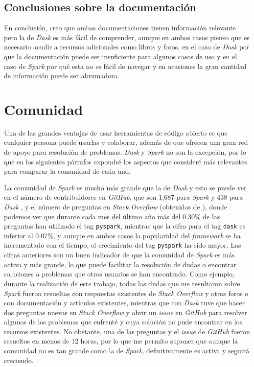 \subsection{Conclusiones sobre la documentación}

En conclusión, creo que ambas documentaciones tienen información relevante pero la de \textit{Dask} es más fácil de comprender, aunque en ambos casos pienso que es necesario acudir a recursos adicionales como libros y foros, en el caso de \textit{Dask} por que la documentación puede ser insuficiente para algunos casos de uso y en el caso de \textit{Spark} por qué esta no es fácil de navegar y en ocasiones la gran cantidad de información puede ser abrumadora.


\section{Comunidad}

Una de las grandes ventajas de usar herramientas de código abierto es que cualquier persona puede usarlas y colaborar, además de que ofrecen una gran red de apoyo para resolución de problemas. \textit{Dask} y \textit{Spark} no son la excepción, por lo que en los siguientes párrafos expondré los aspectos que consideré más relevantes para comparar la comunidad de cada uno.

La comunidad de \textit{Spark} es mucho más grande que la de \textit{Dask} y esto se puede ver en el número de contribuidores en \textit{GitHub}, que son 1,687 para \textit{Spark} \cite{repo-spark} y 438 para \textit{Dask} \cite{repo-dask}, y el número de preguntas en \textit{Stack Overflow} (obtenidas de \cite{stackoverflow-stats}), donde podemos ver que durante cada mes del último año más del 0.30\% de las preguntas han utilizado el tag \texttt{pyspark}, mientras que la cifra para el tag \texttt{dask} es inferior al 0.07\%, y aunque en ambos casos la popularidad del \textit{framework} se ha incrementado con el tiempo, el crecimiento del tag \texttt{pyspark} ha sido mayor. Las cifras anteriores son un buen indicador de que la comunidad de \textit{Spark} es más activa y más grande, lo que puede facilitar la resolución de dudas o encontrar soluciones a problemas que otros usuarios se han encontrado. Como ejemplo, durante la realización de este trabajo, todas las dudas que me resultaron sobre \textit{Spark} fueron resueltas con respuestas existentes de \textit{Stack Overflow} y otros foros o con documentación y artículos existentes, mientras que con \textit{Dask} tuve que hacer dos preguntas nuevas en \textit{Stack Overflow} y abrir un \textit{issue} en \textit{GitHub} para resolver algunos de los problemas que enfrenté y cuya solución no pude encontrar en los recursos existentes. No obstante, una de las preguntas y el \textit{issue} de \textit{GitHub} fueron resueltos en menos de 12 horas, por lo que me permito suponer que aunque la comunidad no es tan grande como la de \textit{Spark}, definitivamente es activa y seguirá creciendo. 

